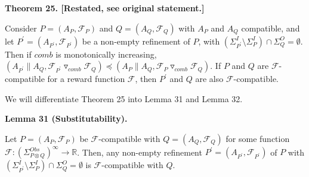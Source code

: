  
\par\medskip\noindent\textbf{Theorem 25. [Restated, see original statement.]}\par
 
 
Consider $P=(A_{P},\mathcal{F}_{P})$ and $Q=(A_{Q},\mathcal{F}_{Q})$ with $A_{P}$ and $A_{Q}$ compatible, and let $P^{\prime}=(A_{P^{\prime}},\mathcal{F}_{P^{\prime}})$ be a non-empty refinement of $P$, with $(\Sigma_{P^{\prime}}^{I}\setminus\Sigma_{P}^{I})\cap\Sigma_{Q}^{O}=\emptyset$. Then if $\mathit{comb}$ is monotonically increasing, $(A_{P^{\prime}}\parallel A_{Q},{{\mathcal{F}_{P^{\prime}}}\mathbin{\triangledown_{\mathit{comb}}}{\mathcal{F}_{Q}}})\preceq(A_{P}\parallel A_{Q},{{\mathcal{F}_{P}}\mathbin{\triangledown_{\mathit{comb}}}{\mathcal{F}_{Q}}})$. If $P$ and $Q$ are $\mathcal{F}$-compatible for a reward function $\mathcal{F}$, then $P^{\prime}$ and $Q$ are also $\mathcal{F}$-compatible.\par
 
 
 
 
 
We will differentiate Theorem 25 into Lemma 31 and Lemma 32.\par
 
 
 
\par\medskip\noindent\textbf{Lemma 31 (Substitutability).}\par
 
 
Let $P=(A_{P},\mathcal{F}_{P})$ be $\mathcal{F}$-compatible with $Q=(A_{Q},\mathcal{F}_{Q})$ for some function $\mathcal{F}:(\Sigma_{P\otimes Q}^{Obs})^{\infty}\to\mathbb{R}$. Then, any non-empty refinement $P^{\prime}=(A_{P^{\prime}},\mathcal{F}_{P^{\prime}})$ of $P$ with $(\Sigma_{P^{\prime}}^{I}\setminus\Sigma_{P}^{I})\cap\Sigma_{Q}^{O}=\emptyset$ is $\mathcal{F}$-compatible with $Q$.\par
 
 
 
 
 
